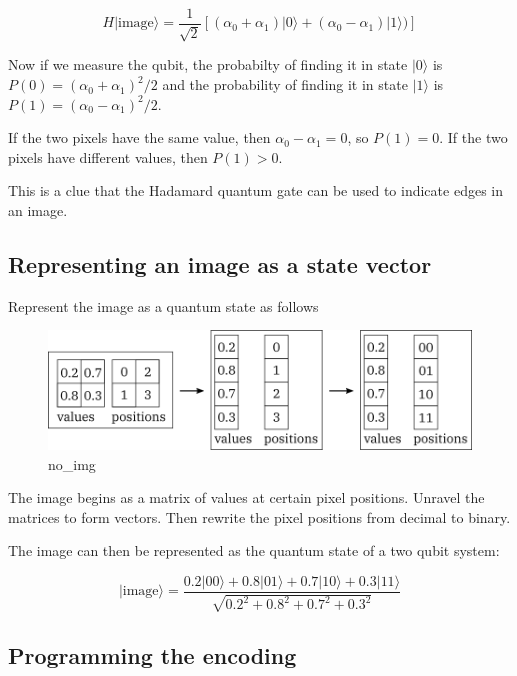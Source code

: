 \documentclass[11pt]{article}
\makeatletter
\def\maxwidth{\ifdim\Gin@nat@width>\linewidth\linewidth
    \else\Gin@nat@width\fi}
\let\Oldincludegraphics\includegraphics
\renewcommand{\includegraphics}[1]{\Oldincludegraphics[width=.8\maxwidth]{#1}}
\makeatother
\begin{document}
\[H|\textrm{image}\rangle =  \frac{1}{\sqrt{2}}\left[(\alpha_0 + \alpha_1)|0\rangle + (\alpha_0 - \alpha_1)|1\rangle)\right]\]

Now if we measure the qubit, the probabilty of finding it in state
\(|0\rangle\) is \(P(0) = (\alpha_0 + \alpha_1)^2/2\) and the
probability of finding it in state \(|1\rangle\) is
\(P(1) = (\alpha_0 - \alpha_1)^2/2\).

If the two pixels have the same value, then \(\alpha_0 - \alpha_1 = 0\),
so \(P(1) = 0\). If the two pixels have different values, then
\(P(1) > 0\).

This is a clue that the Hadamard quantum gate can be used to indicate
edges in an image.

    \hypertarget{representing-an-image-as-a-state-vector}{%
\subsection{Representing an image as a state
vector}\label{representing-an-image-as-a-state-vector}}

    Represent the image as a quantum state as follows

\begin{figure}
\centering
\includegraphics{../img/quantum_encoding.png}
\caption{no\_img}
\end{figure}

    The image begins as a matrix of values at certain pixel positions.
Unravel the matrices to form vectors. Then rewrite the pixel positions
from decimal to binary.

The image can then be represented as the quantum state of a two qubit
system:

\[|\textrm{image}\rangle = \frac{0.2 |00\rangle + 0.8 |01\rangle + 0.7 |10\rangle + 0.3 |11\rangle}{\sqrt{0.2^2 + 0.8^2 + 0.7^2 + 0.3^2}}\]

    \hypertarget{programming-the-encoding}{%
\subsection{Programming the encoding}\label{programming-the-encoding}}
\end{document}
